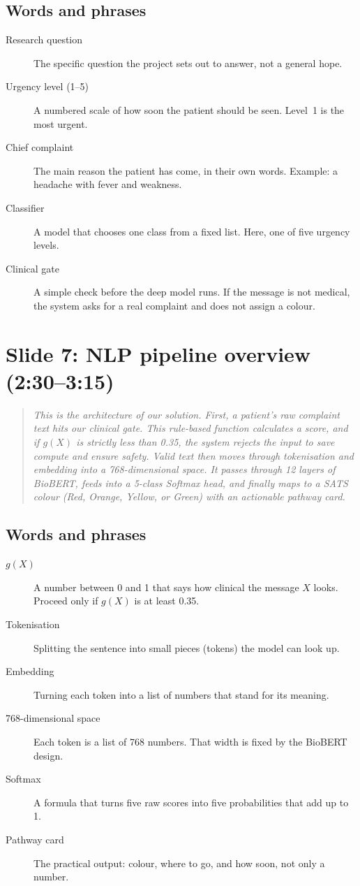 \documentclass[11pt,a4paper]{article}
\newcommand{\say}[1]{\begin{quote}\itshape #1\end{quote}}
\newcommand{\terms}{\subsection*{Words and phrases}}
\begin{document}
\terms
\begin{description}
\item[Research question] The specific question the project sets out to answer, not a general hope.
\item[Urgency level (1--5)] A numbered scale of how soon the patient should be seen. Level~1 is the most urgent.
\item[Chief complaint] The main reason the patient has come, in their own words. Example: a headache with fever and weakness.
\item[Classifier] A model that chooses one class from a fixed list. Here, one of five urgency levels.
\item[Clinical gate] A simple check before the deep model runs. If the message is not medical, the system asks for a real complaint and does not assign a colour.
\end{description}

\section{Slide 7: NLP pipeline overview (2:30--3:15)}

\say{This is the architecture of our solution. First, a patient's raw complaint text hits our clinical gate. This rule-based function calculates a score, and if \(g(X)\) is strictly less than 0.35, the system rejects the input to save compute and ensure safety. Valid text then moves through tokenisation and embedding into a 768-dimensional space. It passes through 12 layers of BioBERT, feeds into a 5-class Softmax head, and finally maps to a SATS colour (Red, Orange, Yellow, or Green) with an actionable pathway card.}

\terms
\begin{description}
\item[\(g(X)\)] A number between 0 and 1 that says how clinical the message \(X\) looks. Proceed only if \(g(X)\) is at least 0.35.
\item[Tokenisation] Splitting the sentence into small pieces (tokens) the model can look up.
\item[Embedding] Turning each token into a list of numbers that stand for its meaning.
\item[768-dimensional space] Each token is a list of 768 numbers. That width is fixed by the BioBERT design.
\item[Softmax] A formula that turns five raw scores into five probabilities that add up to 1.
\item[Pathway card] The practical output: colour, where to go, and how soon, not only a number.
\end{description}
\end{document}
